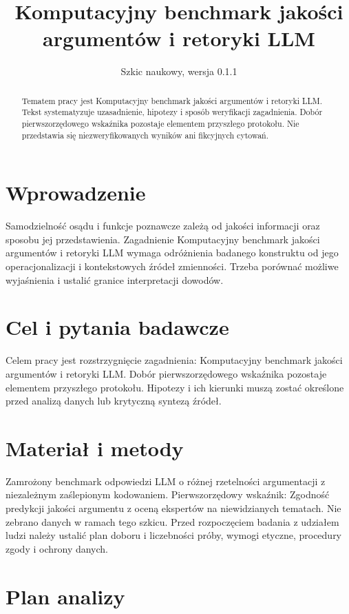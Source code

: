 \documentclass[11pt,a4paper]{article}
\title{Komputacyjny benchmark jakości argumentów i retoryki LLM}
\author{}
\date{Szkic naukowy, wersja 0.1.1}
\begin{document}
\maketitle

\begin{abstract}

Tematem pracy jest Komputacyjny benchmark jakości argumentów i retoryki LLM. Tekst systematyzuje uzasadnienie, hipotezy i sposób weryfikacji zagadnienia. Dobór pierwszorzędowego wskaźnika pozostaje elementem przyszłego protokołu. Nie przedstawia się niezweryfikowanych wyników ani fikcyjnych cytowań.

\end{abstract}

\section{Wprowadzenie}

Samodzielność osądu i funkcje poznawcze zależą od jakości informacji oraz sposobu jej przedstawienia. Zagadnienie Komputacyjny benchmark jakości argumentów i retoryki LLM wymaga odróżnienia badanego konstruktu od jego operacjonalizacji i kontekstowych źródeł zmienności. Trzeba porównać możliwe wyjaśnienia i ustalić granice interpretacji dowodów.

\section{Cel i pytania badawcze}

Celem pracy jest rozstrzygnięcie zagadnienia: Komputacyjny benchmark jakości argumentów i retoryki LLM. Dobór pierwszorzędowego wskaźnika pozostaje elementem przyszłego protokołu. Hipotezy i ich kierunki muszą zostać określone przed analizą danych lub krytyczną syntezą źródeł.

\section{Materiał i metody}

Zamrożony benchmark odpowiedzi LLM o różnej rzetelności argumentacji z niezależnym zaślepionym kodowaniem. Pierwszorzędowy wskaźnik: Zgodność predykcji jakości argumentu z oceną ekspertów na niewidzianych tematach. Nie zebrano danych w ramach tego szkicu. Przed rozpoczęciem badania z udziałem ludzi należy ustalić plan doboru i liczebności próby, wymogi etyczne, procedury zgody i ochrony danych.

\section{Plan analizy}
\end{document}
